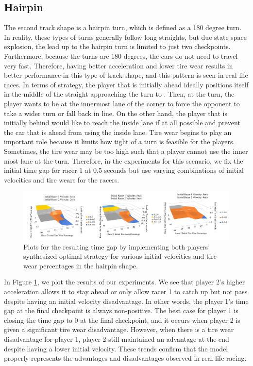 \FloatBarrier
\subsection{Hairpin}
 The second track shape is a hairpin turn, which is defined as a 180 degree turn. In reality, these types of turns generally follow long straights, but due state space explosion, the lead up to the hairpin turn is limited to just two checkpoints. Furthermore, because the turns are 180 degrees, the cars do not need to travel very fast. Therefore, having better acceleration and lower tire wear results in better performance in this type of track shape, and this pattern is seen in real-life races. In terms of strategy, the player that is initially ahead ideally positions itself in the middle of the straight approaching the turn to . Then, at the turn, the player wants to be at the innermost lane of the corner to force the opponent to take a wider turn or fall back in line. On the other hand, the player that is initially behind would like to reach the inside lane if at all possible and prevent the car that is ahead from using the inside lane. Tire wear begins to play an important role because it limits how tight of a turn is feasible for the players. Sometimes, the tire wear may be too high such that a player cannot use the inner most lane at the turn. Therefore, in the experiments for this scenario, we fix the initial time gap for racer 1 at 0.5 seconds but use varying combinations of initial velocities and tire wears for the racers. 

\begin{figure}[t!]
\includegraphics[width=\textwidth]{Figures/HairpinExp.pdf} 
    \caption[Results of scenarios in hairpin case study.] {Plots for the resulting time gap by implementing both players' synthesized optimal strategy for various initial velocities and tire wear percentages in the hairpin shape.}
    \label{fig:hp_exp}
\end{figure}

 In Figure \ref{fig:hp_exp}, we plot the results of our experiments. We see that player 2's higher acceleration allows it to stay ahead or only allow racer 1 to catch up but not pass despite having an initial velocity disadvantage. In other words, the player 1's time gap at the final checkpoint is always non-positive. The best case for player 1 is closing the time gap to 0 at the final checkpoint, and it occurs when player 2 is given a significant tire wear disadvantage. However, when there is a tire wear disadvantage for player 1, player 2 still maintained an advantage at the end despite having a lower initial velocity. These trends confirm that the model properly represents the advantages and disadvantages observed in real-life racing. 

